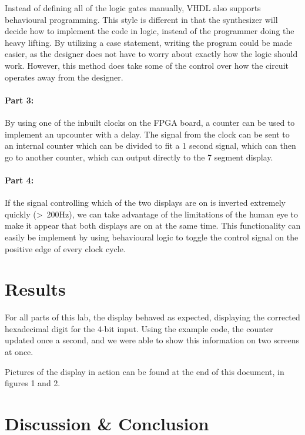 \documentclass{article}
\begin{document}
Instead of defining all of the logic gates manually, VHDL also supports
behavioural programming.
This style is different in that the synthesizer will decide how to implement
the code in logic, instead of the programmer doing the heavy lifting.
By utilizing a case statement, writing the program could be made easier,
as the designer does not have to worry about exactly how the logic should work.
However, this method does take some of the control over how the circuit operates
away from the designer.

\paragraph{Part 3:}

By using one of the inbuilt clocks on the FPGA board, a counter can be used to implement an
upcounter with a delay.
The signal from the clock can be sent to an internal counter which can
be divided to fit a 1 second signal, which can then go to another counter, which can output directly to
the 7 segment display.

\paragraph{Part 4:}

If the signal controlling which of the two displays are on is inverted 
extremely quickly (>~200Hz), we can take advantage of the limitations
of the human eye to make it appear that both displays are on at the same time.
This functionality can easily be implement by using behavioural logic to
toggle the control signal on the positive edge of every clock cycle.

\section{Results}

For all parts of this lab, the display behaved as expected,
displaying the corrected hexadecimal digit for the 4-bit input.
Using the example code, the counter updated once a second, and we were able
to show this information on two screens at once.

Pictures of the display in action can be found at the end of this document, in figures 1 and 2.

\section{Discussion \& Conclusion}
\end{document}
